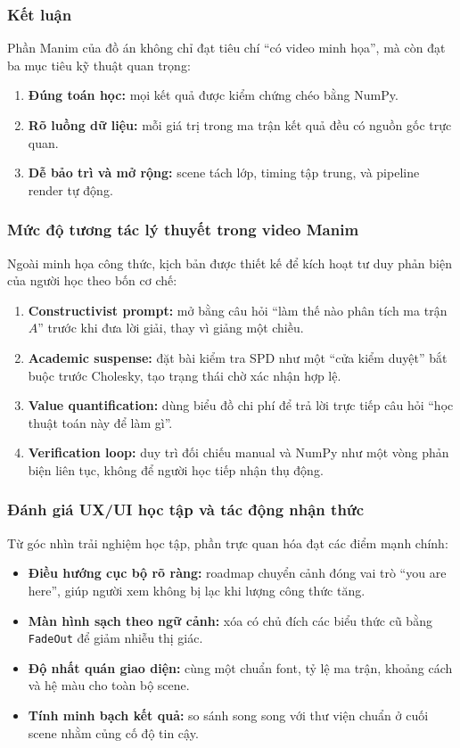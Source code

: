 \documentclass[a4paper]{article}
\begin{document}
\subsubsection{Kết luận}

Phần Manim của đồ án không chỉ đạt tiêu chí ``có video minh họa'', mà còn đạt ba mục tiêu kỹ thuật quan trọng:
\begin{enumerate}
    \item \textbf{Đúng toán học:} mọi kết quả được kiểm chứng chéo bằng NumPy.
    \item \textbf{Rõ luồng dữ liệu:} mỗi giá trị trong ma trận kết quả đều có nguồn gốc trực quan.
    \item \textbf{Dễ bảo trì và mở rộng:} scene tách lớp, timing tập trung, và pipeline render tự động.
\end{enumerate}

\subsubsection{Mức độ tương tác lý thuyết trong video Manim}

Ngoài minh họa công thức, kịch bản được thiết kế để kích hoạt tư duy phản biện của người học theo bốn cơ chế:
\begin{enumerate}
    \item \textbf{Constructivist prompt:} mở bằng câu hỏi ``làm thế nào phân tích ma trận $A$'' trước khi đưa lời giải, thay vì giảng một chiều.
    \item \textbf{Academic suspense:} đặt bài kiểm tra SPD như một ``cửa kiểm duyệt'' bắt buộc trước Cholesky, tạo trạng thái chờ xác nhận hợp lệ.
    \item \textbf{Value quantification:} dùng biểu đồ chi phí để trả lời trực tiếp câu hỏi ``học thuật toán này để làm gì''.
    \item \textbf{Verification loop:} duy trì đối chiếu manual và NumPy như một vòng phản biện liên tục, không để người học tiếp nhận thụ động.
\end{enumerate}

\subsubsection{Đánh giá UX/UI học tập và tác động nhận thức}

Từ góc nhìn trải nghiệm học tập, phần trực quan hóa đạt các điểm mạnh chính:
\begin{itemize}
    \item \textbf{Điều hướng cục bộ rõ ràng:} roadmap chuyển cảnh đóng vai trò ``you are here'', giúp người xem không bị lạc khi lượng công thức tăng.
    \item \textbf{Màn hình sạch theo ngữ cảnh:} xóa có chủ đích các biểu thức cũ bằng \texttt{FadeOut} để giảm nhiễu thị giác.
    \item \textbf{Độ nhất quán giao diện:} cùng một chuẩn font, tỷ lệ ma trận, khoảng cách và hệ màu cho toàn bộ scene.
    \item \textbf{Tính minh bạch kết quả:} so sánh song song với thư viện chuẩn ở cuối scene nhằm củng cố độ tin cậy.
\end{itemize}
\end{document}
